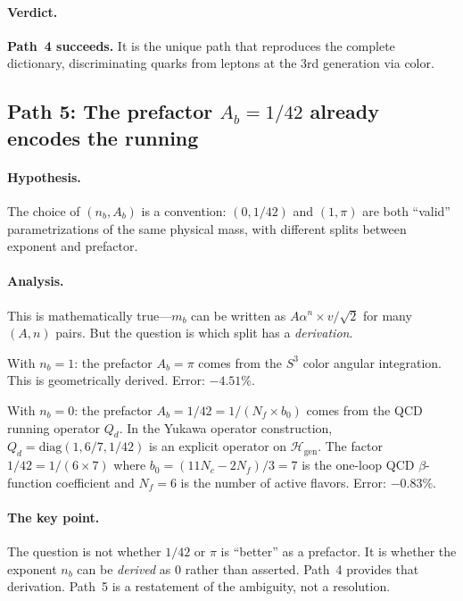 \documentclass[11pt,a4paper]{article}
\theoremstyle{definition}
\theoremstyle{remark}
\begin{document}
\paragraph{Verdict.}  \textbf{Path~4 succeeds.}  It is the unique path that
reproduces the complete dictionary, discriminating quarks from leptons at the
3rd generation via color.

\subsection{Path 5: The prefactor $A_b = 1/42$ already encodes the running}
\label{sec:path5}

\paragraph{Hypothesis.}  The choice of $(n_b, A_b)$ is a convention:
$(0, 1/42)$ and $(1, \pi)$ are both ``valid'' parametrizations of the
same physical mass, with different splits between exponent and prefactor.

\paragraph{Analysis.}  This is mathematically true---$m_b$ can be written
as $A\alpha^n \times v/\sqrt{2}$ for many $(A, n)$ pairs.  But the question
is which split has a \emph{derivation}.

With $n_b = 1$: the prefactor $A_b = \pi$ comes from the $S^3$ color
angular integration.  This is geometrically derived.  Error: $-4.51\%$.

With $n_b = 0$: the prefactor $A_b = 1/42 = 1/(N_f \times b_0)$
comes from the QCD running operator $Q_d$.  In the Yukawa operator
construction, $Q_d = \mathrm{diag}(1, 6/7, 1/42)$ is an explicit
operator on $\mathcal{H}_{\text{gen}}$.  The factor $1/42 = 1/(6 \times 7)$
where $b_0 = (11N_c - 2N_f)/3 = 7$ is the one-loop QCD $\beta$-function
coefficient and $N_f = 6$ is the number of active flavors.  Error: $-0.83\%$.

\paragraph{The key point.}  The question is not whether $1/42$ or $\pi$
is ``better'' as a prefactor.  It is whether the exponent $n_b$ can be
\emph{derived} as 0 rather than asserted.  Path~4 provides that derivation.
Path~5 is a restatement of the ambiguity, not a resolution.
\end{document}
